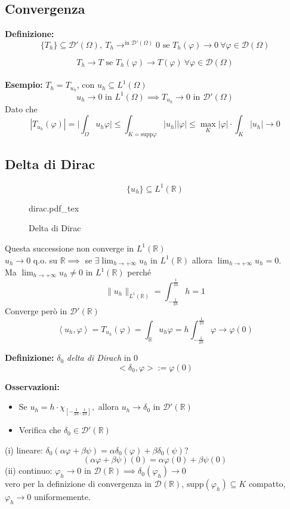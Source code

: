 \documentclass[a4paper]{article}
\newcommand{\incfig}[1]{%
	\def\svgwidth{\columnwidth}
	{#1.pdf_tex}
}
\newcommand{\R}{\mathbb{R}}
\begin{document}
\subsection{Convergenza}
\begin{tcolorbox}
\textbf{Definizione: }
\[\{T_h\} \subseteq  \mathcal D'(\Omega),\ T_h\to^{\text{in }\mathcal D'(\Omega)}0\text{ se }T_h(\varphi)\to 0\ \forall \varphi\in \mathcal D(\Omega)\] 
\end{tcolorbox}
\[T_h\to T\text{ se }T_h(\varphi)\to T(\varphi)	\ \forall \varphi\in \mathcal D(\Omega)\]
\\\textbf{Esempio: }$T_h=T_{u_h}$, con $u_h\subseteq  L^{1}(\Omega)$ \\
\[u_h\to 0\text{ in }L^{1}(\Omega)\implies T_{u_h}\to 0\text{ in }\mathcal D'(\Omega)\]
Dato che
\[|T_{u_h}(\varphi)|=\bigg|\int_{\Omega}^{} u_h\varphi \bigg|\le \int_{K=\text{supp}\varphi}^{} |u_h| |\varphi|\le \max_K|\varphi|\cdot \int_{K}^{}  |u_h|\to 0\]
\subsection{Delta di Dirac}
\[\{u_h\} \subseteq  L^{1}(\R)\]
\begin{figure}[ht]
    \centering
    \incfig{dirac}
    \caption{Delta di Dirac}
    \label{fig:dirac}
\end{figure}
Questa successione non converge in $L^{1}(\R)$\\
$u_h\to 0$ q.o. su $\R\implies $ se $\exists \lim_{h \to +\infty} u_h$ in $L^{1}(\R)$ allora $\lim_{h \to +\infty} u_h=0$.
\\Ma $\lim_{h \to +\infty} u_h\neq 0$ in $L^{1}(\R)$ perché
\[\|u_h\|_{L^{1}(\R)}=\int_{-\frac{1}{2h}}^{\frac{1}{2h}} h=1\]
Converge però in $\mathcal D'(\R)$ 
\[\left<u_h,\varphi \right> =T_{u_h}(\varphi)=\int_{\R}^{} u_h\varphi=h \int_{-\frac{1}{2h}}^{\frac{1}{2h}} \varphi\to \varphi(0)\]  
\begin{tcolorbox}
	\textbf{Definizione: }$\delta_0$ \emph{delta di Dirach} in 0
	\[<\delta_0,\varphi>:=\varphi(0)\]
\end{tcolorbox}
\textbf{Osservazioni:} 
\begin{itemize}
	\item Se $u_h=h\cdot \chi_{[-\frac{1}{2h},\frac{1}{2h}]},$ allora $u_h\to \delta_0$ in $\mathcal D'(\R)$ 
	\item Verifica che $\delta_0\in \mathcal D'(\R)$
\end{itemize}
(i) lineare: $\delta_0(\alpha\varphi+\beta\psi)=\alpha\delta_0(\varphi)+\beta\delta_0(\psi)$?
\[(\alpha\varphi+\beta\psi)(0)=\alpha\varphi(0)+\beta\psi(0)\]
(ii) continuo: $\varphi_h\to 0$ in $\mathcal D(\R)\implies\delta_0(\varphi_h)\to 0$
\\vero per la definizione di convergenza in $\mathcal D(\R)$, $\text{supp}(\varphi_h)\subseteq  K$ compatto, $\varphi_h\to 0$ uniformemente.
\end{document}
